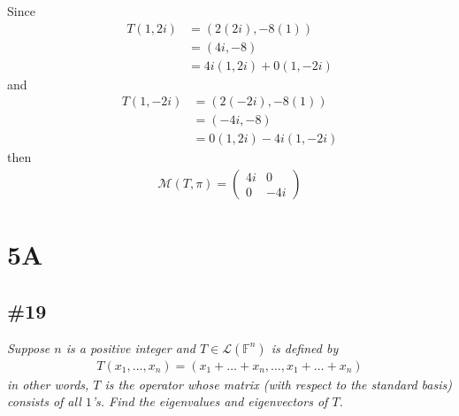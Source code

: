 \documentclass[12pt]{article}
\begin{document}
\begin{enumerate}[\it\ \ (a)\ \ ]
		\noindent Since
		\begin{align*}
			T(1, 2i) &= (2(2i), -8(1)) \\
			&= (4i, -8) \\
			&= 4i(1, 2i) + 0(1, -2i)
		\end{align*}
		and
		\begin{align*}
		T(1, -2i) &= (2(-2i), -8(1)) \\
		&= (-4i, -8) \\
		&= 0(1, 2i) -4i(1, -2i)
		\end{align*}
		then 
		\begin{align*}
			\mathcal{M}(T, \pi) = \left(\begin{array}{cc}
				4i & 0 \\
				0 & -4i
			\end{array}\right)
		\end{align*}
	\end{enumerate}
	
\section*{5A}
\subsection*{\#19}
	{\it Suppose $n$ is a positive integer and $T \in \mathcal{L}(\mathbb{F}^n)$ is defined by}
	\begin{align*}
		T(x_1, \dots, x_n) = (x_1 + \dots + x_n, \dots, x_1 + \dots + x_n)
	\end{align*}
	{\it in other words, $T$ is the operator whose matrix (with respect to the standard basis) consists of all $1$'s.  Find the eigenvalues and eigenvectors of $T$.}\\
	
\end{document}
